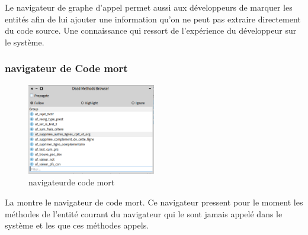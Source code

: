 \documentclass[a4paper]{article}
\begin{document}
Le navigateur de graphe d'appel permet aussi aux développeurs de marquer les entités afin de lui ajouter une information qu'on ne peut pas extraire directement du code source.
Une connaissance qui ressort de l'expérience du développeur sur le système.
\subsubsection{navigateur de Code mort}
\begin{figure}[htbp]
  \begin{center}
  \includegraphics[width=0.5\textwidth]{./figures/deadMethodBrowser.png}
  \caption{navigateurde code mort}
  \label{fig:deadMethodBrowser}
\end{center}
\vspace{-0.3cm}
\end{figure}
La  montre le navigateur de code mort.
Ce navigateur pressent pour le moment les méthodes de l'entité courant du navigateur qui le sont jamais appelé dans le système et les que ces méthodes appels.
\end{document}
